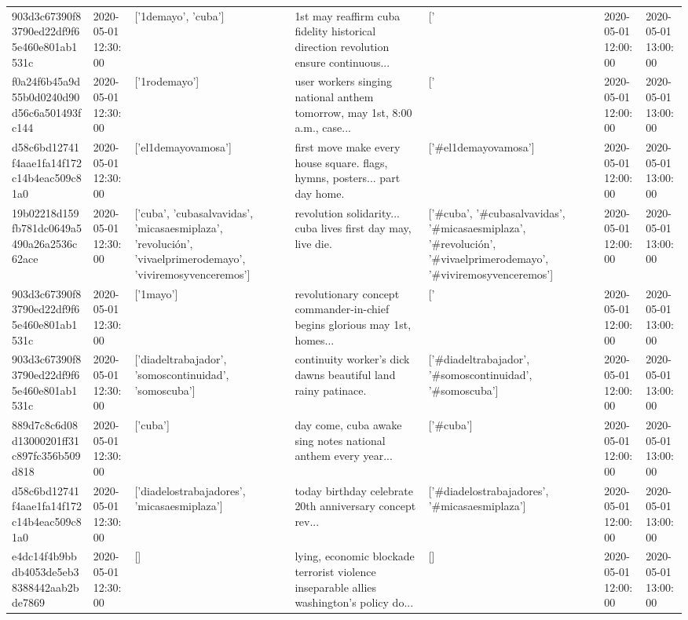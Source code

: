 \begin{tabular}{lllllll}
903d3c67390f83790ed22df9f65e460e801ab1531c & 2020-05-01 12:30:00 & ['1demayo', 'cuba'] & 1st may reaffirm cuba fidelity historical direction revolution ensure continuous... & ['#1demayo', '#cuba'] & 2020-05-01 12:00:00 & 2020-05-01 13:00:00 \\
f0a24f6b45a9d55b0d0240d90d56c6a501493fc144 & 2020-05-01 12:30:00 & ['1rodemayo'] & user workers singing national anthem tomorrow, may 1st, 8:00 a.m., case... & ['#1rodemayo'] & 2020-05-01 12:00:00 & 2020-05-01 13:00:00 \\
d58c6bd12741f4aae1fa14f172c14b4eac509c81a0 & 2020-05-01 12:30:00 & ['el1demayovamosa'] & first move make every house square. flags, hymns, posters... part day home. & ['#el1demayovamosa'] & 2020-05-01 12:00:00 & 2020-05-01 13:00:00 \\
19b02218d159fb781dc0649a5490a26a2536c62ace & 2020-05-01 12:30:00 & ['cuba', 'cubasalvavidas', 'micasaesmiplaza', 'revolución', 'vivaelprimerodemayo', 'viviremosyvenceremos'] & revolution solidarity... cuba lives first day may, live die. & ['#cuba', '#cubasalvavidas', '#micasaesmiplaza', '#revolución', '#vivaelprimerodemayo', '#viviremosyvenceremos'] & 2020-05-01 12:00:00 & 2020-05-01 13:00:00 \\
903d3c67390f83790ed22df9f65e460e801ab1531c & 2020-05-01 12:30:00 & ['1mayo'] & revolutionary concept commander-in-chief begins glorious may 1st, homes... & ['#1mayo'] & 2020-05-01 12:00:00 & 2020-05-01 13:00:00 \\
903d3c67390f83790ed22df9f65e460e801ab1531c & 2020-05-01 12:30:00 & ['diadeltrabajador', 'somoscontinuidad', 'somoscuba'] & continuity worker's dick dawns beautiful land rainy patinace. & ['#diadeltrabajador', '#somoscontinuidad', '#somoscuba'] & 2020-05-01 12:00:00 & 2020-05-01 13:00:00 \\
889d7c8c6d08d13000201ff31c897fc356b509d818 & 2020-05-01 12:30:00 & ['cuba'] & day come, cuba awake sing notes national anthem every year... & ['#cuba'] & 2020-05-01 12:00:00 & 2020-05-01 13:00:00 \\
d58c6bd12741f4aae1fa14f172c14b4eac509c81a0 & 2020-05-01 12:30:00 & ['diadelostrabajadores', 'micasaesmiplaza'] & today birthday celebrate 20th anniversary concept rev... & ['#diadelostrabajadores', '#micasaesmiplaza'] & 2020-05-01 12:00:00 & 2020-05-01 13:00:00 \\
e4dc14f4b9bbdb4053de5eb38388442aab2bde7869 & 2020-05-01 12:30:00 & [] & lying, economic blockade terrorist violence inseparable allies washington's policy do... & [] & 2020-05-01 12:00:00 & 2020-05-01 13:00:00 \\

\end{tabular}
